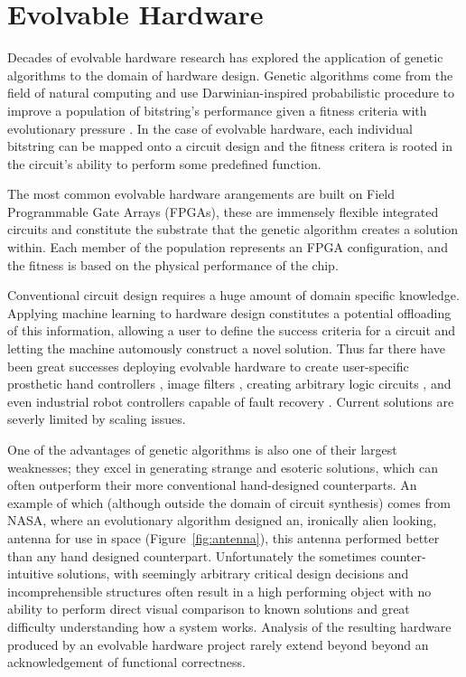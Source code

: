 \section{Evolvable Hardware}
Decades of evolvable hardware research has explored the application of genetic algorithms to
the domain of hardware design. Genetic algorithms come from the field of natural
computing and use Darwinian-inspired probabilistic procedure to improve a population
of bitstring's
performance given a fitness criteria with evolutionary pressure \cite{Goldberg:1989:GAS:534133}.
In the case of evolvable hardware,
each individual bitstring can be mapped onto a circuit design
and the fitness critera is rooted
in the circuit's ability to perform some predefined function.

The most common evolvable hardware arangements
are built on Field Programmable Gate Arrays (FPGAs), these are immensely
flexible integrated circuits and constitute the substrate that the genetic
algorithm creates a solution within. Each member of the population
represents an FPGA configuration, and the fitness is based on the
physical performance of the chip.

Conventional circuit design requires a huge amount of domain specific knowledge.
Applying machine learning to hardware design constitutes a potential
offloading of this information, allowing a user to define the success
criteria for a circuit and letting the machine automously construct a novel solution.
Thus far there have been great successes deploying evolvable hardware to
create user-specific prosthetic hand controllers \cite{Kajitani1999AnEH},
image filters \cite{HybridFilter}, creating arbitrary logic circuits
\cite{Vasicek2011}, and even industrial robot controllers capable of fault recovery \cite{10.1007/3-540-61093-6_6}.
Current solutions are severly limited by scaling issues.

One of the advantages of genetic algorithms is also one of their largest
weaknesses; they excel in generating strange and esoteric solutions,
which can often outperform their more conventional hand-designed counterparts.
An example of which (although outside the domain of circuit synthesis)
comes from NASA, where an evolutionary algorithm designed an, ironically
alien looking, antenna for use in space (Figure~\ref{fig:antenna})\cite{Antenna}, this antenna performed better
than any hand designed counterpart.
Unfortunately the sometimes counter-intuitive solutions, with seemingly arbitrary
critical design decisions and incomprehensible structures often result in a high
performing object with no ability to perform direct
visual comparison to known solutions and great difficulty understanding how a system
works. Analysis of the resulting hardware produced by an evolvable hardware project rarely
extend beyond beyond an acknowledgement of functional correctness.

